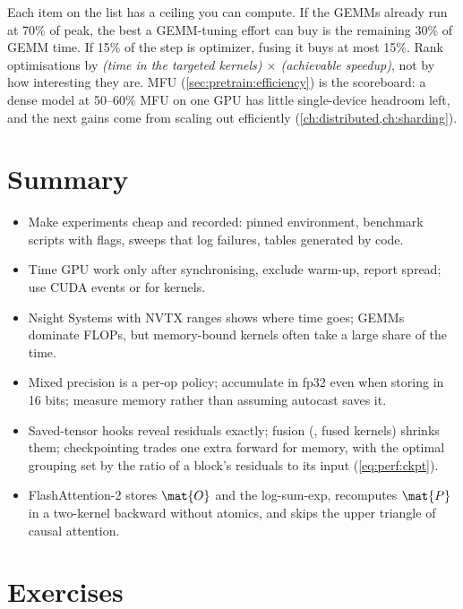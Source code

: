 \begin{systemslens}
Each item on the list has a ceiling you can compute. If the GEMMs already run at 70\% of peak, the
best a GEMM-tuning effort can buy is the remaining 30\% of GEMM time. If 15\% of the step is
optimizer, fusing it buys at most 15\%. Rank optimisations by \emph{(time in the targeted kernels)
$\times$ (achievable speedup)}, not by how interesting they are. MFU (\cref{sec:pretrain:efficiency})
is the scoreboard: a dense model at 50--60\% MFU on one GPU has little single-device headroom left,
and the next gains come from scaling out efficiently (\cref{ch:distributed,ch:sharding}).
\end{systemslens}

\section{Summary}\label{sec:perf:summary}
\begin{itemize}
\item Make experiments cheap and recorded: pinned environment, benchmark scripts with flags, sweeps
  that log failures, tables generated by code.
\item Time GPU work only after synchronising, exclude warm-up, report spread; use CUDA events or
   for kernels.
\item Nsight Systems with NVTX ranges shows where time goes; GEMMs dominate FLOPs, but memory-bound
  kernels often take a large share of the time.
\item Mixed precision is a per-op policy; accumulate in fp32 even when storing in 16 bits; measure
  memory rather than assuming autocast saves it.
\item Saved-tensor hooks reveal residuals exactly; fusion (, fused kernels)
  shrinks them; checkpointing trades one extra forward for memory, with the optimal grouping set by
  the ratio of a block's residuals to its input (\cref{eq:perf:ckpt}).
\item FlashAttention-2 stores $\mat{O}$ and the log-sum-exp, recomputes $\mat{P}$ in a two-kernel
  backward without atomics, and skips the upper triangle of causal attention.
\end{itemize}

\section{Exercises}\label{sec:perf:exercises}

